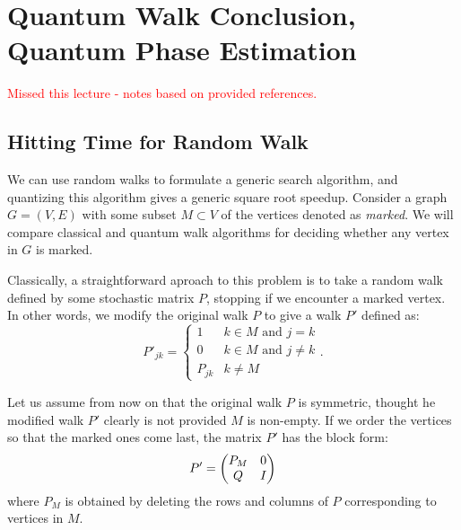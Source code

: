 \section{Quantum Walk Conclusion, Quantum Phase Estimation}
\textcolor{red}{Missed this lecture - notes based on provided references.}

\subsection*{Hitting Time for Random Walk}
We can use random walks to formulate a generic search algorithm, and quantizing this algorithm gives a generic square root speedup. Consider a graph $G = (V, E)$ with some subset $M \subset V$ of the vertices denoted as \emph{marked}. We will compare classical and quantum walk algorithms for deciding whether any vertex in $G$ is marked.

Classically, a straightforward aproach to this problem is to take a random walk defined by some stochastic matrix $P$, stopping if we encounter a marked vertex. In other words, we modify the original walk $P$ to give a walk $P'$ defined as:
\begin{equation}
    P'_{jk} = \begin{cases}
        1 & k \in M \text{ and } j = k
        \\ 0 & k \in M \text{ and } j \neq k
        \\ P_{jk} & k \neq M
    \end{cases}.
\end{equation}

Let us assume from now on that the original walk $P$ is symmetric, thought he modified walk $P'$ clearly is not provided $M$ is non-empty. If we order the vertices so that the marked ones come last, the matrix $P'$ has the block form:
\begin{equation}
    P' = \begin{pmatrix}
        P_M & 0 \\ Q & I
    \end{pmatrix}
\end{equation}
where $P_M$ is obtained by deleting the rows and columns of $P$ corresponding to vertices in $M$. 

